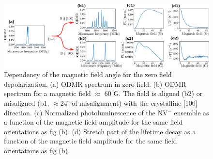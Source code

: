 \documentclass[preprintnumbers,amsmath,amssymb,superscriptaddress,twocolumn,showpacs]{revtex4-2}
\begin{document}
%

\begin{figure}
\includegraphics[width=.95\textwidth]{Figures/fig 100 vs 1x1x1x1}
\caption{Dependency of the magnetic field angle for the zero field depolarization. (a) ODMR spectrum in zero field. (b) ODMR spectrum for a magnetic field $\approx$ 60 G. The field is aligned (b2) or misaligned (b1, $\approx 24^\circ$ of misalignment) with the crystalline [100] direction. (c) Normalized photoluminescence of the NV$^-$ ensemble as a function of the magnetic field amplitude for the same field orientations as fig (b). (d) Stretch part of the lifetime decay as a function of the magnetic field amplitude for the same field orientations as fig (b).}
\label{100_VS_1x4}
\end{figure}
\end{document}
